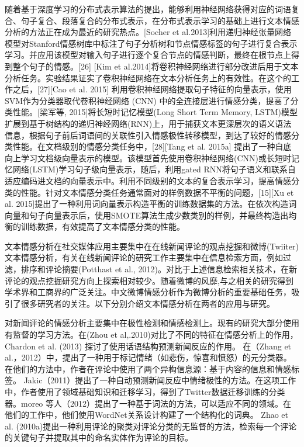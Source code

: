 随着基于深度学习的分布式表示算法的提出，能够利用神经网络获得对应的词语复合、句子复合、段落复合的分布式表示，在分布式表示学习的基础上进行文本情感分析的方法正在成为最近的研究热点。[Socher et al.2013]利用递归神经张量网络模型对Stanford情感树库中标注了句子分析树和节点情感标签的句子进行复合表示学习。并应用该模型对输入句子进行逐个复合节点的情感判断，最终在根节点上得到整个句子的情感。[26] [Kim et al.2014]将卷积神经网络进行部分改进后用于文本分析任务。实验结果证实了卷积神经网络在文本分析任务上的有效性。在这个的工作之后，[27][Cao et al. 2015] 利用卷积神经网络提取句子特征的向量表示，使用SVM作为分类器取代卷积神经网络 (CNN) 中的全连接层进行情感分类，提高了分类性能。[梁军等, 2015]将长短时记忆模型(Long Short Term Memory, LSTM)模型扩展到基于树结构的递归神经网络(RNN)上，用于捕获文本更深层次的语义语法信息，根据句子前后词语间的关联性引入情感极性转移模型，到达了较好的情感分类性能。在文档级别的情感分类任务中，[28][Tang et al. 2015a] 提出了一种自底向上学习文档级向量表示的模型。该模型首先使用卷积神经网络(CNN)或长短时记忆网络(LSTM)学习句子级向量表示，随后，利用gated RNN将句子语义和联系自适应编码进文档的向量表示中。利用不同级别的文本的复合表示学习，提高情感分类的性能。针对文本情感分类任务通常面对的样例数据不平衡的问题，[15][Xu et al. 2015]提出了一种利用词向量表示构造平衡的训练数据集的方法。在依次构造词向量和句子向量表示后，使用SMOTE算法生成少数类别的样例，并最终构造出均衡的训练数据，有效提高了文本情感分类的性能。


文本情感分析在社交媒体应用主要集中在在线新闻评论的观点挖掘和微博(Twiiter)文本情感分析，有关在线新闻评论的研究工作主要集中在信息检索方面，例如过滤，排序和评论摘要(Potthast et al., 2012)。对比于上述信息检索相关技术，在新评论的观点挖掘研究方向上探索相对较少。随着微博的风靡,与之相关的研究得到学术界和工商界的广泛关注。中文微博情感分析作为微博分析的重要基础任务，吸引了很多研究者的关注。以下分别介绍文本情感分析在两者的应用与研究。

对新闻评论的情感分析主要集中在极性检测和情感检测上。现有的研究大部分使用有监督的学习方法。在(Zhou et al,.2010)对比了不同的特征在情感分析上的作用，Chardon et al. (2013) 探讨了使用话语结构预测新闻反应的作用。 在（Zhang et al.，2012）中，提出了一种用于标记情绪（如悲伤，惊喜和愤怒）的元分类器。在他们的方法中，作者在评论中使用了两个异构信息源：基于内容的信息和情感标签。 Jakic（2011）提出了一种自动预测新闻反应中情绪极性的方法。在这项工作中，作者使用了领域基础知识和迁移学习，得到了Twitter数据迁移训练的分类器。moreo 等人（2012）提出了一种基于词法的方法，可以适应不同的领域。在他们的工作中，他们使用WordNet关系设计构建了一个结构化的词典。 Zhao et al. (2010a)提出一种利用评论的聚类对评论分类的无监督的方法，检索每一个评论的关键句子并提取其中的命名实体作为评论的目标。

